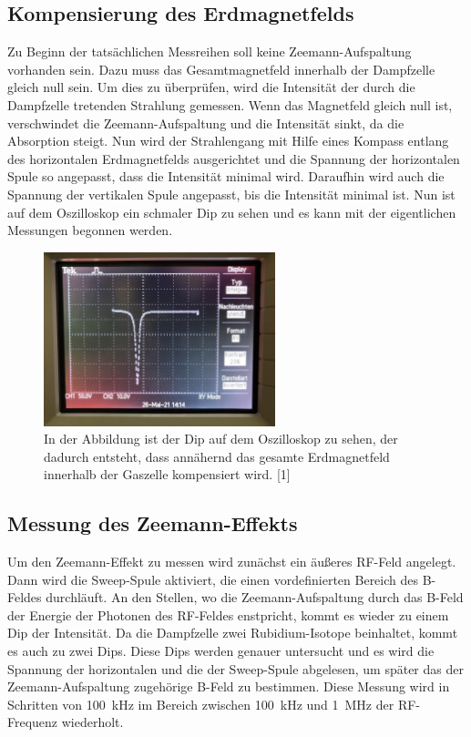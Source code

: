     \subsection{Kompensierung des Erdmagnetfelds}
        Zu Beginn der tatsächlichen Messreihen soll keine Zeemann-Aufspaltung vorhanden sein. Dazu muss das Gesamtmagnetfeld innerhalb der Dampfzelle gleich null sein. Um dies zu überprüfen, wird die Intensität
        der durch die Dampfzelle tretenden Strahlung gemessen. Wenn das Magnetfeld gleich null ist, verschwindet die Zeemann-Aufspaltung und die Intensität sinkt, da die Absorption steigt. Nun wird der 
        Strahlengang mit Hilfe eines Kompass entlang des horizontalen Erdmagnetfelds ausgerichtet und die Spannung der horizontalen Spule so angepasst, dass die Intensität minimal wird. Daraufhin wird auch die
        Spannung der vertikalen Spule angepasst, bis die Intensität minimal ist. Nun ist auf dem Oszilloskop ein schmaler Dip zu sehen und es kann mit der eigentlichen Messungen begonnen werden.  

        \FloatBarrier

        \begin{figure}[h]
          \centering
          \includegraphics[width = 0.6\textwidth]{pictures/B_0.jpg}
          \caption{In der Abbildung ist der Dip auf dem Oszilloskop zu sehen, der dadurch entsteht, dass annähernd das gesamte Erdmagnetfeld innerhalb der Gaszelle kompensiert wird. [1]}
          \label{fig:B_0_dip}
        \end{figure}

        \FloatBarrier

        \noindent

    \subsection{Messung des Zeemann-Effekts}
        Um den Zeemann-Effekt zu messen wird zunächst ein äußeres RF-Feld angelegt. Dann wird die Sweep-Spule aktiviert, die einen vordefinierten Bereich des B-Feldes durchläuft. An den Stellen, wo die 
        Zeemann-Aufspaltung durch das B-Feld der Energie der Photonen des RF-Feldes enstpricht, kommt es wieder zu einem Dip der Intensität. Da die Dampfzelle zwei Rubidium-Isotope beinhaltet, kommt es auch zu 
        zwei Dips. Diese Dips werden genauer untersucht und es wird die Spannung der horizontalen und die der Sweep-Spule abgelesen, um später das der Zeemann-Aufspaltung zugehörige B-Feld zu bestimmen. Diese 
        Messung wird in Schritten von \SI{100}{\kilo\hertz} im Bereich zwischen \SI{100}{\kilo\hertz} und \SI{1}{\mega\hertz} der RF-Frequenz wiederholt. 

        
        
